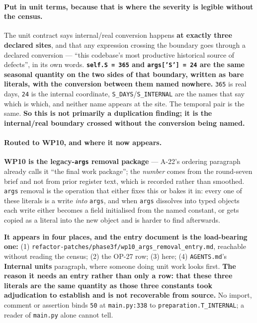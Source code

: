 \documentclass[
  10pt,
]{article}
\begin{document}
\paragraph{Put in unit terms, because that is where the severity is legible without the census.}
The unit contract says internal/real conversion happens \textbf{at exactly three declared sites}, and that any expression crossing the boundary goes through a declared conversion --- ``this codebase's most productive historical source of defects'', in its own words. \textbf{\texttt{self.S = 365} and \texttt{args['S'] = 24} are the same seasonal quantity on the two sides of that boundary, written as bare literals, with the conversion between them named nowhere.} \texttt{365} is real days, \texttt{24} is the internal coordinate, \texttt{S\_DAYS}/\texttt{S\_INTERNAL} are the names that say which is which, and neither name appears at the site. The temporal pair is the same. \textbf{So this is not primarily a duplication finding; it is the internal/real boundary crossed without the conversion being named.}

\paragraph{Routed to WP10, and where it now appears.}
\textbf{WP10 is the legacy-\texttt{args} removal package} --- A-22's ordering paragraph already calls it ``the final work package''; the \emph{number} comes from the round-seven brief and not from prior register text, which is recorded rather than smoothed. \texttt{args} removal is the operation that either fixes this or bakes it in: every one of these literals is a write \emph{into} \texttt{args}, and when \texttt{args} dissolves into typed objects each write either becomes a field initialised from the named constant, or gets copied as a literal into the new object and is harder to find afterwards.

\textbf{It appears in four places, and the entry document is the load-bearing one:} (1) \texttt{refactor-patches/\allowbreak{}phase3f/\allowbreak{}wp10\_args\_removal\_entry.md}, reachable without reading the census; (2) the OP-27 row; (3) here; (4) \texttt{AGENTS.md}'s \textbf{Internal units} paragraph, where someone doing unit work looks first. \textbf{The reason it needs an entry rather than only a row: that these three literals are the same quantity as those three constants took adjudication to establish and is not recoverable from source.} No import, comment or assertion binds \texttt{50} at \texttt{main.py:338} to \texttt{preparation.T\_INTERNAL}; a reader of \texttt{main.py} alone cannot tell.
\end{document}

